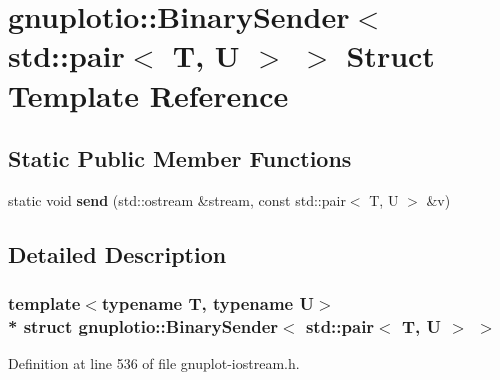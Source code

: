 \hypertarget{structgnuplotio_1_1_binary_sender_3_01std_1_1pair_3_01_t_00_01_u_01_4_01_4}{}\section{gnuplotio\+:\+:Binary\+Sender$<$ std\+:\+:pair$<$ T, U $>$ $>$ Struct Template Reference}
\label{structgnuplotio_1_1_binary_sender_3_01std_1_1pair_3_01_t_00_01_u_01_4_01_4}
\subsection*{Static Public Member Functions}
\begin{DoxyCompactItemize}
\item 
static void {\bfseries send} (std\+::ostream \&stream, const std\+::pair$<$ T, U $>$ \&v)\hypertarget{structgnuplotio_1_1_binary_sender_3_01std_1_1pair_3_01_t_00_01_u_01_4_01_4_a9d949c8e7b1dea493288b0a2dd95cbff}{}\label{structgnuplotio_1_1_binary_sender_3_01std_1_1pair_3_01_t_00_01_u_01_4_01_4_a9d949c8e7b1dea493288b0a2dd95cbff}

\end{DoxyCompactItemize}


\subsection{Detailed Description}
\subsubsection*{template$<$typename T, typename U$>$\\*
struct gnuplotio\+::\+Binary\+Sender$<$ std\+::pair$<$ T, U $>$ $>$}



Definition at line 536 of file gnuplot-\/iostream.\+h.

